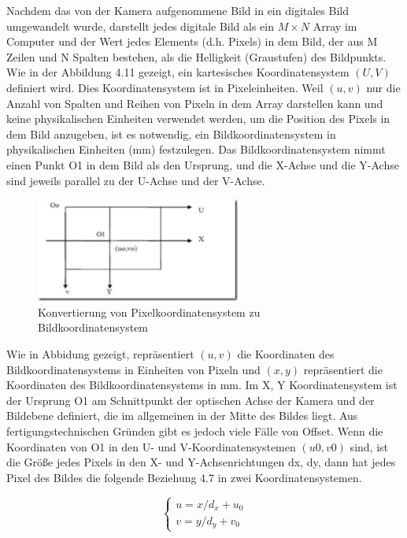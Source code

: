
Nachdem das von der Kamera aufgenommene Bild in ein digitales Bild umgewandelt wurde, darstellt jedes digitale Bild als ein $M×N$ Array im Computer und der Wert jedes Elements (d.h. Pixels) in dem Bild, der aus M Zeilen und N Spalten bestehen, als die Helligkeit (Graustufen) des Bildpunkts. Wie in der Abbildung 4.11 gezeigt, ein kartesisches Koordinatensystem $(U,V)$ definiert wird. Dies Koordinatensystem ist in Pixeleinheiten. Weil $(u,v)$ nur die Anzahl von Spalten und Reihen von Pixeln in dem Array darstellen kann und keine physikalischen Einheiten verwendet werden, um die Position des Pixels in dem Bild anzugeben, ist es notwendig, ein Bildkoordinatensystem in physikalischen Einheiten (mm) festzulegen. Das Bildkoordinatensystem nimmt einen Punkt O1 in dem Bild als den Ursprung, und die X-Achse und die Y-Achse sind jeweils parallel zu der U-Achse und der V-Achse.

\begin{figure}[htb]
 \centering 
 \includegraphics[keepaspectratio,width=0.6\textwidth]{images/4_ZweiteErfahrung/Kamera/pixelkoordinate.pdf}
 \caption{Konvertierung von Pixelkoordinatensystem zu Bildkoordinatensystem}
 \label{fig:Konvertierung von Pixelkoordinatensystem zu Bildkoordinatensystem}
\end{figure} 

Wie in Abbidung gezeigt, repräsentiert $(u,v)$ die Koordinaten des Bildkoordinatensystems in Einheiten von Pixeln und $(x,y)$ repräsentiert die Koordinaten des Bildkoordinatensystems in mm. Im X, Y Koordinatensystem ist der Ursprung O1 am Schnittpunkt der optischen Achse der Kamera und der Bildebene definiert, die im allgemeinen in der Mitte des Bildes liegt. Aus fertigungstechnischen Gründen gibt es jedoch viele Fälle von Offset. Wenn die Koordinaten von O1 in den U- und V-Koordinatensystemen $(u0, v0)$ sind, ist die Größe jedes Pixels in den X- und Y-Achsenrichtungen dx, dy, dann hat jedes Pixel des Bildes die folgende Beziehung 4.7 in zwei Koordinatensystemen.

\begin{equation}
   \begin{cases} 
	u = x/d_x + u_0	 \\  
	v = y/d_y + v_0	
	\end{cases}
\end{equation}


